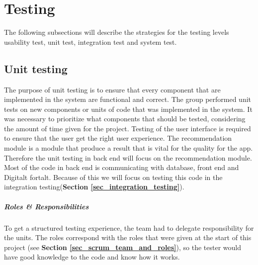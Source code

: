 \chapter{Testing}
\label{chap_testing}

The following subsections will describe the strategies for the testing levels usability test, unit test, integration test and system test. 

\section{Unit testing}
\label{sec_unit_testing}

The purpose of unit testing is to ensure that every component that are implemented in the system are functional and correct. The group performed unit tests on new components or units of code that was implemented in the system. It was necessary to prioritize what components that should be tested, considering the amount of time given for the project. Testing of the user interface is required to ensure that the user get the right user experience. The recommendation module is a module that produce a result that is vital for the quality for the app. Therefore the unit testing in back end will focus on the recommendation module. Most of the code in back end is communicating with database, front end and Digitalt fortalt. Because of this we will focus on testing this code in the integration testing(\textbf{Section \ref{sec_integration_testing}}).\newline

\paragraph{Roles \& Responsibilities}
To get a structured testing experience, the team had to delegate responsibility for the units. The roles correspond with the roles that were given at the start of this project (see \textbf{Section \ref{sec_scrum_team_and_roles}}), so the tester would have good knowledge to the code and know how it works.  




